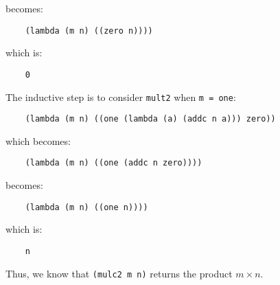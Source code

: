\documentclass{article}
\begin{document}
\begin{enumerate}
    becomes:
    \begin{verbatim}
    (lambda (m n) ((zero n)))) 
    \end{verbatim}
    \vspace{-1em}
    which is:
    \begin{verbatim}
    0
    \end{verbatim}
    \vspace{-1em}
    The inductive step is to consider \texttt{mult2} when \texttt{m = one}: 
    \begin{verbatim}
    (lambda (m n) ((one (lambda (a) (addc n a))) zero)) 
    \end{verbatim}
    \vspace{-1em}
    which becomes:
    \begin{verbatim}
    (lambda (m n) ((one (addc n zero)))) 
    \end{verbatim}
    \vspace{-1em}
    becomes:
    \begin{verbatim}
    (lambda (m n) ((one n)))) 
    \end{verbatim}
    \vspace{-1em}
    which is:
    \begin{verbatim}
    n
    \end{verbatim}
    \vspace{-1em}
    Thus, we know that \texttt{(mulc2 m n)} returns the product $m \times n$.
\end{enumerate}
\end{document}
